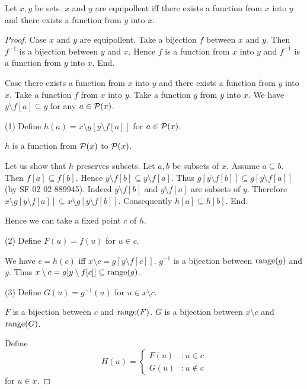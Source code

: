 \documentclass{article}
\begin{document}
  \begin{forthel}
    \begin{theorem}
      Let $x,y$ be sets.
      $x$ and $y$ are equipollent iff there exists a function from $x$ into $y$ and there exists a function from $y$ into $x$.
    \end{theorem}
    \begin{proof}
      Case $x$ and $y$ are equipollent.
        Take a bijection $f$ between $x$ and $y$.
        Then $f^{-1}$ is a bijection between $y$ and $x$.
        Hence $f$ is a function from $x$ into $y$ and $f^{-1}$ is a function from $y$ into $x$.
      End.

      Case there exists a function from $x$ into $y$ and there exists a function from $y$ into $x$.
        Take a function $f$ from $x$ into $y$.
        Take a function $g$ from $y$ into $x$.
        We have $y \setminus f[a] \subseteq y$ for any $a \in \mathcal{P}(x)$.

        (1) Define $h(a) = x \setminus g[y \setminus f[a]]$ for $a \in \mathcal{P}(x)$.

        $h$ is a function from $\mathcal{P}(x)$ to $\mathcal{P}(x)$.

        Let us show that $h$ preserves subsets.
          Let $a,b$ be subsets of $x$.
          Assume $a \subseteq b$.
          Then $f[a] \subseteq f[b]$.
          Hence $y \setminus f[b] \subseteq y \setminus f[a]$.
          Thus $g[y \setminus f[b]] \subseteq g[y \setminus f[a]]$ (by SF 02 02 889945).
          Indeed $y \setminus f[b]$ and $y \setminus f[a]$ are subsets of $y$.
          Therefore $x \setminus g[y \setminus f[a]] \subseteq x \setminus g[y \setminus f[b]]$.
          Consequently $h[a] \subseteq h[b]$.
        End.

        Hence we can take a fixed point $c$ of $h$.

        (2) Define $F(u) = f(u)$ for $u \in c$.

        We have $c = h(c)$ iff $x \setminus c = g[y \setminus f[c]]$.
        $g^{-1}$ is a bijection between $\operatorname{range}(g)$ and $y$.
        Thus $x \setminus c = g[y \setminus f[c]] \subseteq \operatorname{range}(g)$.

        (3) Define $G(u) = g^{-1}(u)$ for $u \in x \setminus c$.

        $F$ is a bijection between $c$ and $\operatorname{range}(F)$.
        $G$ is a bijection between $x \setminus c$ and $\operatorname{range}(G)$.

        Define \[ H(u) =
          \begin{cases}
            F(u) & : u \in c \\
            G(u) & : u \notin c
          \end{cases} \]
        for $u \in x$.


\end{proof}
\end{forthel}
\end{document}
